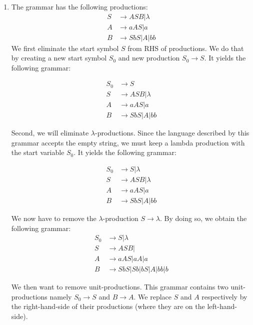\begin{enumerate}[label={(\alph*)}]
    \item The grammar has the following productions:\\
    \begin{align*}
        S &\rightarrow ASB | \lambda\\
        A &\rightarrow aAS | a\\
        B &\rightarrow SbS | A | bb
    \end{align*}
    \noindent We first eliminate the start symbol $S$ from RHS of productions. We do that by creating a new start symbol $S_0$ and new production $S_0 \rightarrow S$. It yields the following grammar:
    
    \begin{align*}
        S_0 &\rightarrow S\\
        S &\rightarrow ASB | \lambda\\
        A &\rightarrow aAS | a\\
        B &\rightarrow SbS | A | bb
    \end{align*}
    
    \noindent Second, we will eliminate $\lambda$-productions. Since the language described by this grammar accepts the empty string, we must keep a lambda production with the start variable $S_0$. It yields the following grammar:
    
    \begin{align*}
        S_0 &\rightarrow S | \lambda\\
        S &\rightarrow ASB | \lambda\\
        A &\rightarrow aAS | a\\
        B &\rightarrow SbS | A | bb
    \end{align*}
    
    \noindent We now have to remove the $\lambda$-production $S \rightarrow \lambda$. By doing so, we obtain the following grammar:
    \begin{align*}
        S_0 &\rightarrow S | \lambda\\
        S &\rightarrow ASB |\\
        A &\rightarrow aAS | aA | a\\
        B &\rightarrow SbS | Sb | bS | A | bb | b
    \end{align*}
    
    \noindent We then want to remove unit-productions. This grammar contains two unit-productions namely $S_0 \rightarrow S$ and $B \rightarrow A$. We replace $S$ and $A$ respectively by the right-hand-side of their productions (where they are on the left-hand-side). 
    

\end{enumerate}
